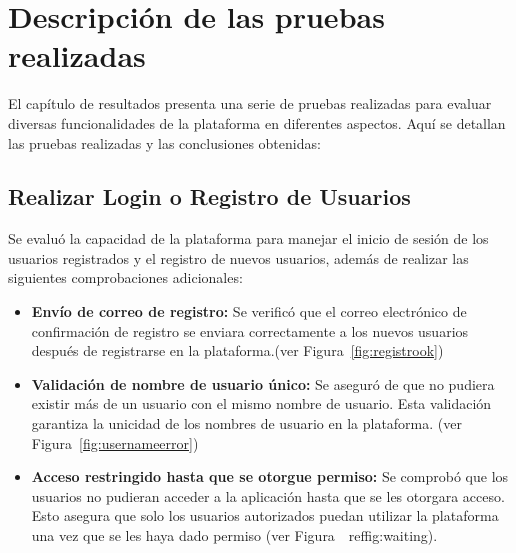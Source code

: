 \documentclass[a4paper, 12pt]{book}
\begin{document}
\section{Descripción de las pruebas realizadas}
\label{sec:pruebas}
El capítulo de resultados presenta una serie de pruebas realizadas para evaluar diversas funcionalidades de la plataforma en diferentes aspectos. Aquí se detallan las 
pruebas realizadas y las conclusiones obtenidas:

\subsection{ Realizar Login o Registro de Usuarios}
\label{sec:login-registro}
Se evaluó la capacidad de la plataforma para manejar el inicio de sesión de los usuarios registrados y el registro de nuevos usuarios, además de realizar las siguientes comprobaciones adicionales:
  \begin{itemize}
    \item \textbf{Envío de correo de registro:} Se verificó que el correo electrónico de confirmación de registro se enviara correctamente a los nuevos usuarios 
    después de registrarse en la plataforma.(ver Figura~\ref{fig:registrook})
    \item \textbf{Validación de nombre de usuario único:} Se aseguró de que no pudiera existir más de un usuario con el mismo nombre de usuario. Esta validación 
    garantiza la unicidad de los nombres de usuario en la plataforma. (ver Figura~\ref{fig:usernameerror})
    \item \textbf{Acceso restringido hasta que se otorgue permiso:}  Se comprobó que los usuarios no pudieran acceder a la aplicación hasta que se les otorgara acceso. 
    Esto asegura que solo los usuarios autorizados puedan utilizar la plataforma una vez que se les haya dado permiso (ver Figura~\ ref{fig:waiting}).
  \end{itemize}
\end{document}
